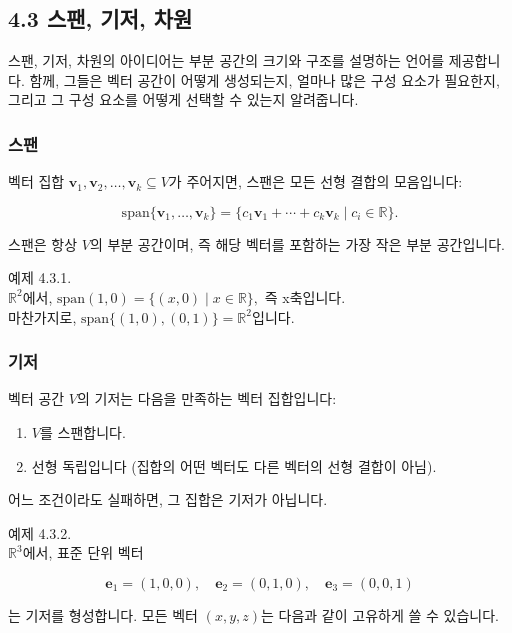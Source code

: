 \documentclass[
  12pt,
  a4paper,
]{article}
\begin{document}
\subsection{4.3 스팬, 기저, 차원}\label{43-span-basis-dimension}

스팬, 기저, 차원의 아이디어는 부분 공간의 크기와 구조를 설명하는 언어를 제공합니다. 함께, 그들은 벡터 공간이 어떻게 생성되는지, 얼마나 많은 구성 요소가 필요한지, 그리고 그 구성 요소를 어떻게 선택할 수 있는지 알려줍니다.

\subsubsection{스팬}\label{span}

벡터 집합 \({\mathbf{v}_1, \mathbf{v}_2, \dots, \mathbf{v}_k} \subseteq V\)가 주어지면, 스팬은 모든 선형 결합의 모음입니다:

\[\text{span}\{\mathbf{v}_1, \dots, \mathbf{v}_k\} = \{ c_1\mathbf{v}_1 + \cdots + c_k\mathbf{v}_k \mid c_i \in \mathbb{R} \}.\]

스팬은 항상 \(V\)의 부분 공간이며, 즉 해당 벡터를 포함하는 가장 작은 부분 공간입니다.

예제 4.3.1.\\
\(\mathbb{R}^2\)에서, \( \text{span}{(1,0)} = \{(x,0) \mid x \in \mathbb{R}\},\) 즉 x축입니다.\\
마찬가지로, \(\text{span}\{(1,0),(0,1)\} = \mathbb{R}^2\)입니다.

\subsubsection{기저}\label{basis}

벡터 공간 \(V\)의 기저는 다음을 만족하는 벡터 집합입니다:

\begin{enumerate}
\def\labelenumi{\arabic{enumi}.}
\item
  \(V\)를 스팬합니다.
\item
  선형 독립입니다 (집합의 어떤 벡터도 다른 벡터의 선형 결합이 아님).
\end{enumerate}

어느 조건이라도 실패하면, 그 집합은 기저가 아닙니다.

예제 4.3.2.\\
\(\mathbb{R}^3\)에서, 표준 단위 벡터

\[\mathbf{e}_1 = (1,0,0), \quad \mathbf{e}_2 = (0,1,0), \quad \mathbf{e}_3 = (0,0,1)\]

는 기저를 형성합니다. 모든 벡터 \((x,y,z)\)는 다음과 같이 고유하게 쓸 수 있습니다.
\end{document}
